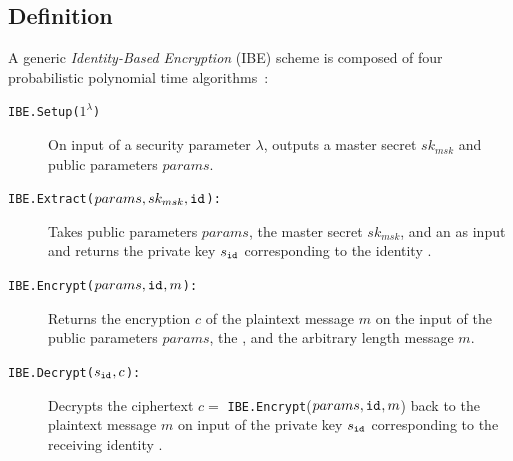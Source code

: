 \subsection{Definition}
A generic \textit{Identity-Based Encryption} (IBE) scheme is composed of four probabilistic polynomial time algorithms~\cite{art:BonehF01}:
\begin{description}
    \item[\texttt{IBE.Setup($1^{\lambda}$)}] On input of a security parameter $\lambda$, outputs a master secret $sk_{msk}$ and public parameters $params$.
    \item[\texttt{IBE.Extract($params, sk_{msk}, \mathtt{id}_{}$):}] Takes public parameters $params$, the master secret $sk_{msk}$, and an \id{} as input and returns the private key $s_{\mathtt{id}_{}}$ corresponding to the identity \id{}.
    \item[\texttt{IBE.Encrypt($params, \mathtt{id}_{}, m$):}] Returns the encryption $c$ of the plaintext message $m$ on the input of the public parameters $params$, the \id{}, and the arbitrary length message $m$.
    \item[\texttt{IBE.Decrypt($s_{\mathtt{id}_{}}, c$):}] Decrypts the ciphertext $c =$ \texttt{IBE.Encrypt}($params, \mathtt{id}_{}, m$) back to the plaintext message $m$ on input of the private key $s_{\mathtt{id}_{}}$ corresponding to the receiving identity \id{}.
\end{description}

